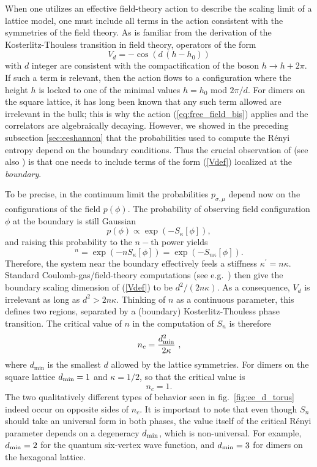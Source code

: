 \documentclass[11pt]{iopart}
\begin{document}
When one utilizes an effective field-theory action to describe the scaling limit of a lattice model, one must include all terms in the action consistent with the symmetries of the field theory. As is familiar from the derivation of the Kosterlitz-Thouless transition in field theory, operators of the form 
\begin{equation}
 V_d=-\cos \left(d \,(h-h_0)\right)
 \label{Vdef}
\end{equation}
with $d$ integer 
are consistent with the compactification  of the boson $h\to h + 2\pi$.
If such a term is relevant, then the action flows to a configuration where the height $h$ is locked to one of the minimal values $h=h_0$ mod $2\pi/d$. For dimers on the square lattice, it has long been known that any such term allowed are irrelevant in the bulk; this is why the action (\ref{eq:free_field_bis}) applies and the correlators are algebraically decaying. However, we showed in the preceding subsection \ref{sec:eeshannon} that the probabilities used to compute the R\'enyi entropy depend on the boundary conditions. Thus the crucial observation of \cite{Stephan2011} (see also \cite{Shannonee}) is that one needs to include terms of the form (\ref{Vdef}) localized at the {\em boundary}.

To be precise, in the continuum limit the probabilities $p_{\sigma,\mu}$ depend now on the configurations of the field $p(\phi)$. The probability of observing field configuration $\phi$ at the boundary is still Gaussian
\begin{equation}
 p(\phi)\propto \exp(-S_{\kappa}[\phi]),
\end{equation}
and raising this probability to the $n-$th power yields
\begin{equation}
 [p(\phi)]^n=\exp(-n S_{\kappa}[\phi])=\exp(-S_{n\kappa}[\phi]).
\end{equation}
Therefore, the system near the boundary effectively feels a stiffness $\kappa^\prime=n\kappa$. 
Standard Coulomb-gas/field-theory computations (see e.g.\ \cite{Ginsparg,Nienhuis}) then give the boundary scaling dimension of (\ref{Vdef}) to be $d^2/(2n\kappa)$. 
As a consequence, $V_d$ is irrelevant as long as $d^2>2n\kappa$. Thinking of $n$ as a continuous parameter, this defines two regions, separated by a (boundary) Kosterlitz-Thouless phase transition. The critical value of $n$ in the computation of  $S_n$  is therefore
\begin{equation}
 n_c=\frac{d_{\rm min}^2}{2\kappa}\ ,
\end{equation}
where $d_{\min}$ is the smallest $d$ allowed by the lattice symmetries. For dimers on the square lattice $d_{\rm min}=1$ and $\kappa=1/2$, so that the critical value is
\begin{equation}
 n_c=1.
\end{equation}
The two qualitatively different types of behavior seen in fig.\ \ref{fig:ee_d_torus} indeed occur on opposite sides of $n_c$. It is important to note that even though $S_n$ should take an universal form in both phases, the value itself of the critical R\'enyi parameter depends on a degeneracy $d_{\rm min}$, which is non-universal. For example, $d_{\rm min}=2$ for the quantum six-vertex wave function, and $d_{\rm min}=3$ for dimers on the hexagonal lattice. 
\end{document}
